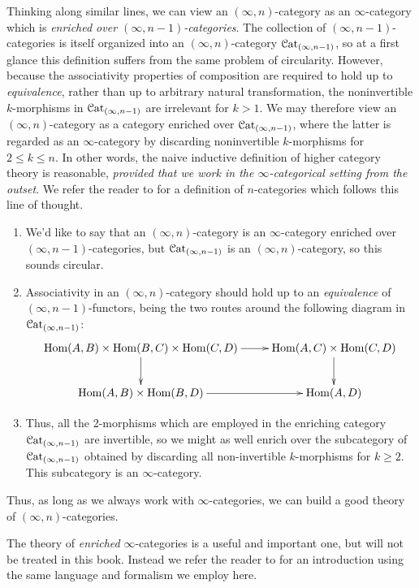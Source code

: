 \begin{1.1.1 Goals and Obstacles}
\begin{itemize}
Thinking along similar lines, we can view an $(\infty,n)$-category as an $\infty$-category which is {\em enriched over $(\infty,n-1)$-categories}. The collection of $(\infty,n-1)$-categories is itself organized into an $(\infty,n)$-category $\operatorname{\mathcal{C}at}_{(\infty,n-1)}$, so at a first glance this definition suffers from the same problem of circularity. However, because the associativity properties of composition are required to hold up to {\em equivalence}, rather than up to arbitrary natural transformation, the noninvertible $k$-morphisms in $\operatorname{\mathcal{C}at}_{(\infty,n-1)}$ are irrelevant for $k > 1$. We may therefore view an $(\infty,n)$-category as a category enriched over $\operatorname{\mathcal{C}at}_{(\infty,n-1)}$, where the latter is regarded as an $\infty$-category by discarding noninvertible $k$-morphisms for $2 \leq k \leq n$.
In other words, the naive inductive definition of higher category theory is reasonable, {\em provided that we work in the $\infty$-categorical setting from the outset}. 
We refer the reader to \cite{tamsamani} for a definition of $n$-categories which follows this line of thought.
\begin{shaded}
\begin{enumerate}\squishlist
\item We'd like to say that an $(\infty,n)$-category is an $\infty$-category enriched over $(\infty,n-1)$-categories, but $\operatorname{\mathcal{C}at}_{(\infty,n-1)}$ is an $(\infty,n)$-category, so this sounds circular.
\item Associativity in an $(\infty,n)$-category should hold up to an \textit{equivalence} of $(\infty,n-1)$-functors, being the two routes around the following diagram in $\operatorname{\mathcal{C}at}_{(\infty,n-1)}$:
$$ \xymatrix{ \Hom(A,B) \times \Hom(B,C) \times \Hom(C,D) \ar[d]
 \ar[r] & \Hom(A,C) \times \Hom(C,D) \ar[d] \\
 \Hom(A,B) \times \Hom(B,D) \ar[r] & \Hom(A,D) }$$ 
\item Thus, all the 2-morphisms which are employed in the enriching category $\operatorname{\mathcal{C}at}_{(\infty,n-1)}$ are invertible, so we might as well enrich over the subcategory of $\operatorname{\mathcal{C}at}_{(\infty,n-1)}$ obtained by discarding all non-invertible $k$-morphisms for $k\geq 2$. This subcategory is an $\infty$-category.
\end{enumerate}
Thus, as long as we always work with $\infty$-categories, we can build a good theory of $(\infty,n)$-categories.
\end{shaded}

The theory of {\em enriched} $\infty$-categories is a useful and important one, but will not be treated in this book. Instead we refer the reader to \cite{DAG} for an introduction using the same language and formalism we employ here. 
\end{itemize}


\end{1.1.1 Goals and Obstacles}
